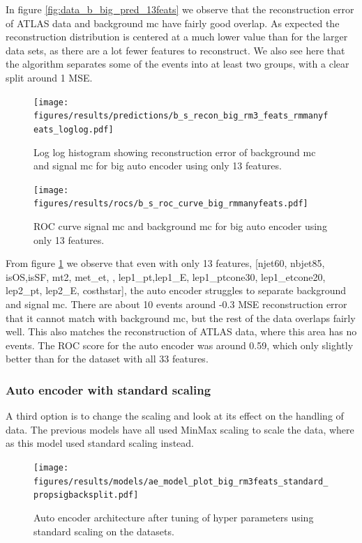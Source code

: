 \documentclass[ reprint, amsmath,amssymb, aps, nofootinbib]{revtex4-2}
\begin{document}
In figure \ref{fig:data_b_big_pred_13feats} we observe that the reconstruction error of ATLAS data and background mc have fairly good overlap. As expected the reconstruction distribution is centered at a much lower value than for the larger data sets, as there are a lot fewer features to reconstruct. We also see here that the algorithm separates some of the events into at least two groups, with a clear split around 1 MSE. 

\begin{figure}[H]
    \centering
    \texttt{[image: figures/results/predictions/b\_s\_recon\_big\_rm3\_feats\_rmmanyfeats\_loglog.pdf]}
    \caption{Log log histogram showing reconstruction error of background mc and signal mc for big auto encoder using only 13 features. }
    \label{fig:roc_sig_big_13feats}
\end{figure}

\begin{figure}[H]
    \centering
         \texttt{[image: figures/results/rocs/b\_s\_roc\_curve\_big\_rmmanyfeats.pdf]}
         \caption{ROC curve signal mc and background mc for big auto encoder using only 13 features.}
         \label{fig:s_b_big_roc_13}
\end{figure}



From figure \ref{fig:roc_sig_big_13feats} we observe that even with only 13 features, 
[njet60,  nbjet85, isOS,isSF,  mt2, met\_et,  , lep1\_pt,lep1\_E, lep1\_ptcone30, lep1\_etcone20, lep2\_pt,  lep2\_E, costhstar], the auto encoder struggles to separate background and signal mc. There are about 10 events around -0.3 MSE reconstruction error that it cannot match with background mc, but the rest of the data overlaps fairly well. This also matches the reconstruction of ATLAS data, where this area has no events. The ROC score for the auto encoder was around 0.59, which only slightly better than for the dataset with all 33 features. \par

\subsubsection{Auto encoder with standard scaling}

A third option is to change the scaling and look at its effect on the handling of data. The previous models have all used MinMax scaling to scale the data, where as this model used standard scaling instead. 


\begin{figure}[H]
     \centering
         \texttt{[image: figures/results/models/ae\_model\_plot\_big\_rm3feats\_standard\_propsigbacksplit.pdf]}
         \caption{Auto encoder architecture after tuning of hyper parameters using standard scaling on the datasets. }
     \label{fig:ae_big_standard}
\end{figure}
\end{document}

